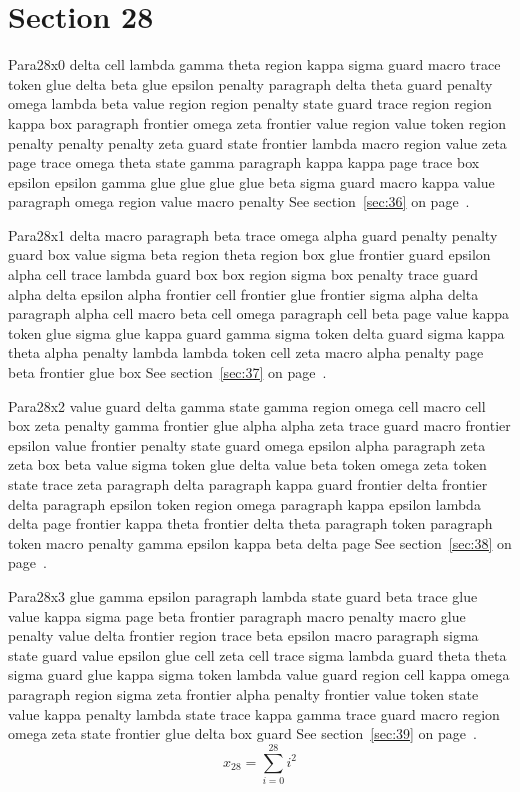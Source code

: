 \documentclass{article}
\begin{document}
\section{Section 28}\label{sec:28}
Para28x0 delta cell lambda gamma theta region kappa sigma guard macro trace token glue delta beta glue epsilon penalty paragraph delta theta guard penalty omega lambda beta value region region penalty state guard trace region region kappa box paragraph frontier omega zeta frontier value region value token region penalty penalty penalty zeta guard state frontier lambda macro region value zeta page trace omega theta state gamma paragraph kappa kappa page trace box epsilon epsilon gamma glue glue glue glue beta sigma guard macro kappa value paragraph omega region value macro penalty See section~\ref{sec:36} on page~\pageref{sec:4}.

Para28x1 delta macro paragraph beta trace omega alpha guard penalty penalty guard box value sigma beta region theta region box glue frontier guard epsilon alpha cell trace lambda guard box box region sigma box penalty trace guard alpha delta epsilon alpha frontier cell frontier glue frontier sigma alpha delta paragraph alpha cell macro beta cell omega paragraph cell beta page value kappa token glue sigma glue kappa guard gamma sigma token delta guard sigma kappa theta alpha penalty lambda lambda token cell zeta macro alpha penalty page beta frontier glue box See section~\ref{sec:37} on page~\pageref{sec:5}.

Para28x2 value guard delta gamma state gamma region omega cell macro cell box zeta penalty gamma frontier glue alpha alpha zeta trace guard macro frontier epsilon value frontier penalty state guard omega epsilon alpha paragraph zeta zeta box beta value sigma token glue delta value beta token omega zeta token state trace zeta paragraph delta paragraph kappa guard frontier delta frontier delta paragraph epsilon token region omega paragraph kappa epsilon lambda delta page frontier kappa theta frontier delta theta paragraph token paragraph token macro penalty gamma epsilon kappa beta delta page See section~\ref{sec:38} on page~\pageref{sec:6}.

Para28x3 glue gamma epsilon paragraph lambda state guard beta trace glue value kappa sigma page beta frontier paragraph macro penalty macro glue penalty value delta frontier region trace beta epsilon macro paragraph sigma state guard value epsilon glue cell zeta cell trace sigma lambda guard theta theta sigma guard glue kappa sigma token lambda value guard region cell kappa omega paragraph region sigma zeta frontier alpha penalty frontier value token state value kappa penalty lambda state trace kappa gamma trace guard macro region omega zeta state frontier glue delta box guard See section~\ref{sec:39} on page~\pageref{sec:7}.
\begin{equation} x_{28} = \sum_{i=0}^{28} i^2 \label{eq:28}\end{equation}
\end{document}
